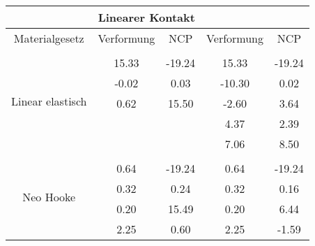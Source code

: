 \begin{table} 
\centering 
\begin{tabular}{c|cc|cc|} 
\cline{2-5} 
 & \multicolumn{2}{|c|}{Linearer Kontakt} &  \\ 
\hline 
\multicolumn{1}{|c|}{Materialgesetz} & \multicolumn{1}{c|}{Verformung} & \multicolumn{1}{c|}{NCP} & \multicolumn{1}{c|}{Verformung} & \multicolumn{1}{c|}{NCP} \\ 
\hline 
\multicolumn{1}{|c|}{\multirow{6}{*}{Linear elastisch}} &\multicolumn{1}{|c|}{} & \multicolumn{1}{|c|}{} & \multicolumn{1}{|c|}{} & \multicolumn{1}{|c|}{} \\ 
\multicolumn{1}{|c|}{} & \multicolumn{1}{|c|}{     15.33} & \multicolumn{1}{|c|}{    -19.24} & \multicolumn{1}{|c|}{     15.33} & \multicolumn{1}{|c|}{    -19.24} \\ 
\multicolumn{1}{|c|}{} & \multicolumn{1}{|c|}{     -0.02} & \multicolumn{1}{|c|}{      0.03} & \multicolumn{1}{|c|}{    -10.30} & \multicolumn{1}{|c|}{      0.02} \\ 
\multicolumn{1}{|c|}{} & \multicolumn{1}{|c|}{      0.62} & \multicolumn{1}{|c|}{     15.50} & \multicolumn{1}{|c|}{     -2.60} & \multicolumn{1}{|c|}{      3.64} \\ 
\multicolumn{1}{|c|}{} & \multicolumn{1}{|c|}{} & \multicolumn{1}{|c|}{} & \multicolumn{1}{|c|}{      4.37} & \multicolumn{1}{|c|}{      2.39} \\ 
\multicolumn{1}{|c|}{} & \multicolumn{1}{|c|}{} & \multicolumn{1}{|c|}{} & \multicolumn{1}{|c|}{      7.06} & \multicolumn{1}{|c|}{      8.50} \\ 
\hline 
\multicolumn{1}{|c|}{\multirow{7}{*}{Neo Hooke}} &\multicolumn{1}{|c|}{} & \multicolumn{1}{|c|}{} & \multicolumn{1}{|c|}{} & \multicolumn{1}{|c|}{} \\ 
\multicolumn{1}{|c|}{} & \multicolumn{1}{|c|}{      0.64} & \multicolumn{1}{|c|}{    -19.24} & \multicolumn{1}{|c|}{      0.64} & \multicolumn{1}{|c|}{    -19.24} \\ 
\multicolumn{1}{|c|}{} & \multicolumn{1}{|c|}{      0.32} & \multicolumn{1}{|c|}{      0.24} & \multicolumn{1}{|c|}{      0.32} & \multicolumn{1}{|c|}{      0.16} \\ 
\multicolumn{1}{|c|}{} & \multicolumn{1}{|c|}{      0.20} & \multicolumn{1}{|c|}{     15.49} & \multicolumn{1}{|c|}{      0.20} & \multicolumn{1}{|c|}{      6.44} \\ 
\multicolumn{1}{|c|}{} & \multicolumn{1}{|c|}{      2.25} & \multicolumn{1}{|c|}{      0.60} & \multicolumn{1}{|c|}{      2.25} & \multicolumn{1}{|c|}{     -1.59} \\ 

\end{tabular}
\end{table}

